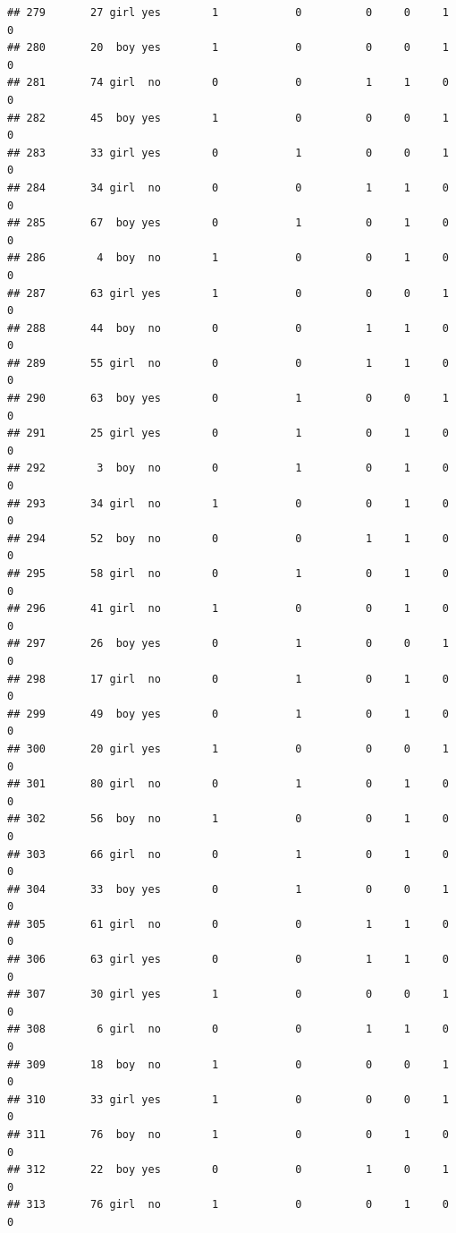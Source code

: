 \documentclass[man]{apa6}
\begin{document}
\begin{verbatim}
## 279       27 girl yes        1            0          0     0     1     0
## 280       20  boy yes        1            0          0     0     1     0
## 281       74 girl  no        0            0          1     1     0     0
## 282       45  boy yes        1            0          0     0     1     0
## 283       33 girl yes        0            1          0     0     1     0
## 284       34 girl  no        0            0          1     1     0     0
## 285       67  boy yes        0            1          0     1     0     0
## 286        4  boy  no        1            0          0     1     0     0
## 287       63 girl yes        1            0          0     0     1     0
## 288       44  boy  no        0            0          1     1     0     0
## 289       55 girl  no        0            0          1     1     0     0
## 290       63  boy yes        0            1          0     0     1     0
## 291       25 girl yes        0            1          0     1     0     0
## 292        3  boy  no        0            1          0     1     0     0
## 293       34 girl  no        1            0          0     1     0     0
## 294       52  boy  no        0            0          1     1     0     0
## 295       58 girl  no        0            1          0     1     0     0
## 296       41 girl  no        1            0          0     1     0     0
## 297       26  boy yes        0            1          0     0     1     0
## 298       17 girl  no        0            1          0     1     0     0
## 299       49  boy yes        0            1          0     1     0     0
## 300       20 girl yes        1            0          0     0     1     0
## 301       80 girl  no        0            1          0     1     0     0
## 302       56  boy  no        1            0          0     1     0     0
## 303       66 girl  no        0            1          0     1     0     0
## 304       33  boy yes        0            1          0     0     1     0
## 305       61 girl  no        0            0          1     1     0     0
## 306       63 girl yes        0            0          1     1     0     0
## 307       30 girl yes        1            0          0     0     1     0
## 308        6 girl  no        0            0          1     1     0     0
## 309       18  boy  no        1            0          0     0     1     0
## 310       33 girl yes        1            0          0     0     1     0
## 311       76  boy  no        1            0          0     1     0     0
## 312       22  boy yes        0            0          1     0     1     0
## 313       76 girl  no        1            0          0     1     0     0

\end{verbatim}
\end{document}
